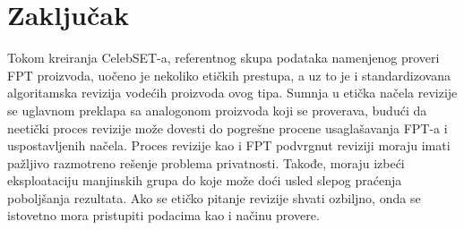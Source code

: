 \documentclass[11pt, a4paper]{article}
\begin{document}
\section{Zaključak}
Tokom kreiranja CelebSET-a, referentnog skupa podataka namenjenog proveri FPT proizvoda, uočeno je nekoliko etičkih prestupa, a uz to je i standardizovana algoritamska revizija vodećih proizvoda ovog tipa. Sumnja u etička načela revizije se uglavnom preklapa sa analogonom proizvoda koji se proverava, budući da neetički proces revizije može dovesti do pogrešne procene usaglašavanja FPT-a i uspostavljenih načela. Proces revizije kao i FPT podvrgnut reviziji moraju imati pažljivo razmotreno rešenje problema privatnosti. Takođe, moraju izbeći eksploataciju manjinskih grupa do koje može doći usled slepog praćenja poboljšanja rezultata. Ako se etičko pitanje revizije shvati ozbiljno, onda se istovetno mora pristupiti podacima kao i načinu provere.
\end{document}
